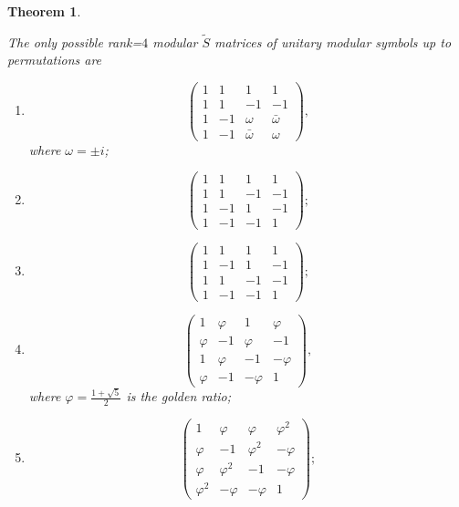 \documentclass[12pt,psamsfonts]{amsart}
\newcommand{\tS}{\tilde{S}}
\numberwithin{equation}{section}
\newtheorem{theorem}{Theorem}[section]
\theoremstyle{definition}
\begin{document}
\begin{theorem}\label{Srank4}

The only possible rank=$4$ modular $\tS$ matrices of
\emph{unitary} modular symbols up to permutations are

\begin{enumerate}

\item

  \[
 \begin{pmatrix}
   1& 1& 1 & 1 \\
   1 & 1& -1 &-1\\
   1 & -1&\omega &\bar{\omega}\\
   1&-1&\bar{\omega} & \omega
 \end{pmatrix},
 \]
where $\omega=\pm i$;

\item

  \[
 \begin{pmatrix}
   1& 1& 1 &1 \\
   1 & 1& -1&-1  \\
   1 & -1 &1 &-1 \\
   1 &-1 & -1& 1
 \end{pmatrix};
 \]

 \item

  \[
 \begin{pmatrix}
   1& 1& 1 & 1 \\
   1 & -1& 1 &-1 \\
   1 & 1 &-1 &-1 \\
   1 &-1 &-1 & 1
 \end{pmatrix};
 \]

 \item

  \[
 \begin{pmatrix}
   1& \varphi& 1 & \varphi \\
   \varphi & -1& \varphi &-1  \\
   1& \varphi &-1 &-\varphi \\
   \varphi &-1 &-\varphi & 1
 \end{pmatrix},
 \] where $\varphi=\frac{1+\sqrt{5}}{2}$ is the golden ratio;

 \item

 \[
 \begin{pmatrix}
   1& \varphi & \varphi &\varphi^2 \\
   \varphi & -1& \varphi^2 &-\varphi  \\
   \varphi & \varphi^2 &-1 &-\varphi \\
   \varphi^2 &-\varphi &-\varphi & 1
 \end{pmatrix};
 \]


\end{enumerate}
\end{theorem}
\end{document}
